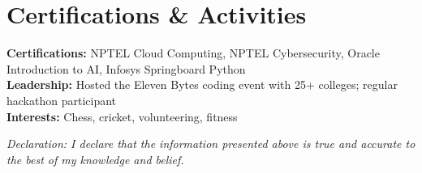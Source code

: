 \documentclass[a4paper,10pt]{article}
\begin{document}
\section*{Certifications \& Activities}
\textbf{Certifications:} NPTEL Cloud Computing, NPTEL Cybersecurity, Oracle Introduction to AI, Infosys Springboard Python\\
\textbf{Leadership:} Hosted the Eleven Bytes coding event with 25+ colleges; regular hackathon participant\\
\textbf{Interests:} Chess, cricket, volunteering, fitness

\vspace{4pt}
{\footnotesize\textit{Declaration: I declare that the information presented above is true and accurate to the best of my knowledge and belief.}}
\end{document}
